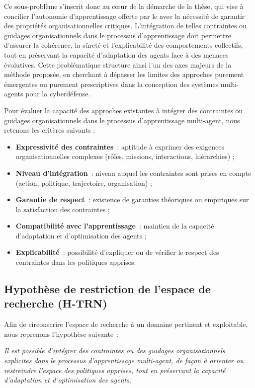 Ce sous-problème s'inscrit donc au cœur de la démarche de la thèse, qui vise à concilier l'autonomie d'apprentissage offerte par le  avec la nécessité de garantir des propriétés organisationnelles critiques. L'intégration de telles contraintes ou guidages organisationnels dans le processus d'apprentissage doit permettre d'assurer la cohérence, la sûreté et l'explicabilité des comportements collectifs, tout en préservant la capacité d'adaptation des agents face à des menaces évolutives. Cette problématique structure ainsi l'un des axes majeurs de la méthode proposée, en cherchant à dépasser les limites des approches purement émergentes ou purement prescriptives dans la conception des systèmes multi-agents pour la cyberdéfense.

Pour évaluer la capacité des approches existantes à intégrer des contraintes ou guidages organisationnels dans le processus d'apprentissage multi-agent, nous retenons les critères suivants :
\begin{itemize}
  \item \textbf{Expressivité des contraintes}~: aptitude à exprimer des exigences organisationnelles complexes (rôles, missions, interactions, hiérarchies) ;
  \item \textbf{Niveau d’intégration}~: niveau auquel les contraintes sont prises en compte (action, politique, trajectoire, organisation) ;
  \item \textbf{Garantie de respect}~: existence de garanties théoriques ou empiriques sur la satisfaction des contraintes ;
  \item \textbf{Compatibilité avec l’apprentissage}~: maintien de la capacité d’adaptation et d’optimisation des agents ;
  \item \textbf{Explicabilité}~: possibilité d’expliquer ou de vérifier le respect des contraintes dans les politiques apprises.
\end{itemize}

\subsection*{Hypothèse de restriction de l’espace de recherche (H-TRN)}

Afin de circonscrire l’espace de recherche à un domaine pertinent et exploitable, nous reprenons l’hypothèse suivante~:

\textit{Il est possible d’intégrer des contraintes ou des guidages organisationnels explicites dans le processus d’apprentissage multi-agent, de façon à orienter ou restreindre l’espace des politiques apprises, tout en préservant la capacité d’adaptation et d’optimisation des agents.}

